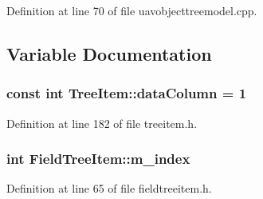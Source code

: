 \-Definition at line 70 of file uavobjecttreemodel.\-cpp.



\subsection{\-Variable \-Documentation}
\hypertarget{group___u_a_v_object_browser_plugin_gad4ee9a1203f812d975a410765ddb8710}{
\subsubsection[{data\-Column}]{\setlength{\rightskip}{0pt plus 5cm}const int {\bf \-Tree\-Item\-::data\-Column} = 1}}\label{group___u_a_v_object_browser_plugin_gad4ee9a1203f812d975a410765ddb8710}


\-Definition at line 182 of file treeitem.\-h.

\hypertarget{group___u_a_v_object_browser_plugin_gab2e489418a60e96de39035e776c4e1e6}{
\subsubsection[{m\-\_\-index}]{\setlength{\rightskip}{0pt plus 5cm}int {\bf \-Field\-Tree\-Item\-::m\-\_\-index}}}\label{group___u_a_v_object_browser_plugin_gab2e489418a60e96de39035e776c4e1e6}


\-Definition at line 65 of file fieldtreeitem.\-h.



